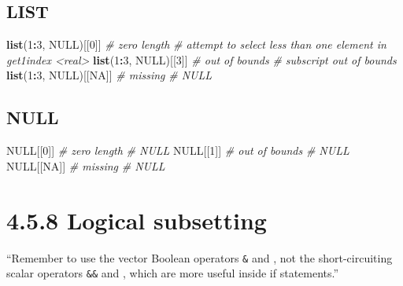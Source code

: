 \documentclass[]{book}
\newenvironment{Shaded}{\begin{snugshade}}{\end{snugshade}}
\newcommand{\CommentTok}[1]{\textcolor[rgb]{0.56,0.35,0.01}{\textit{#1}}}
\newcommand{\DecValTok}[1]{\textcolor[rgb]{0.00,0.00,0.81}{#1}}
\newcommand{\KeywordTok}[1]{\textcolor[rgb]{0.13,0.29,0.53}{\textbf{#1}}}
\newcommand{\NormalTok}[1]{#1}
\newcommand{\OperatorTok}[1]{\textcolor[rgb]{0.81,0.36,0.00}{\textbf{#1}}}
\newcommand{\OtherTok}[1]{\textcolor[rgb]{0.56,0.35,0.01}{#1}}
\begin{document}
\hypertarget{list}{%
\subsection*{LIST}\label{list}}

\begin{Shaded}
\begin{Highlighting}[]
\KeywordTok{list}\NormalTok{(}\DecValTok{1}\OperatorTok{:}\DecValTok{3}\NormalTok{, }\OtherTok{NULL}\NormalTok{)[[}\DecValTok{0}\NormalTok{]] }\CommentTok{# zero length}
\CommentTok{# attempt to select less than one element in get1index <real>}
\KeywordTok{list}\NormalTok{(}\DecValTok{1}\OperatorTok{:}\DecValTok{3}\NormalTok{, }\OtherTok{NULL}\NormalTok{)[[}\DecValTok{3}\NormalTok{]] }\CommentTok{# out of bounds}
\CommentTok{# subscript out of bounds}
\KeywordTok{list}\NormalTok{(}\DecValTok{1}\OperatorTok{:}\DecValTok{3}\NormalTok{, }\OtherTok{NULL}\NormalTok{)[[}\OtherTok{NA}\NormalTok{]] }\CommentTok{# missing}
\CommentTok{# NULL}
\end{Highlighting}
\end{Shaded}

\hypertarget{null}{%
\subsection*{NULL}\label{null}}

\begin{Shaded}
\begin{Highlighting}[]
\OtherTok{NULL}\NormalTok{[[}\DecValTok{0}\NormalTok{]] }\CommentTok{# zero length}
\CommentTok{# NULL}
\OtherTok{NULL}\NormalTok{[[}\DecValTok{1}\NormalTok{]] }\CommentTok{# out of bounds}
\CommentTok{# NULL}
\OtherTok{NULL}\NormalTok{[[}\OtherTok{NA}\NormalTok{]] }\CommentTok{# missing}
\CommentTok{# NULL}
\end{Highlighting}
\end{Shaded}

\hypertarget{logical-subsetting}{%
\section*{4.5.8 Logical subsetting}\label{logical-subsetting}}

``Remember to use the vector Boolean operators \texttt{\&} and \texttt{\textbar{}}, not the short-circuiting scalar operators \texttt{\&\&} and \texttt{\textbar{}\textbar{}}, which are more useful inside if statements.''
\end{document}
